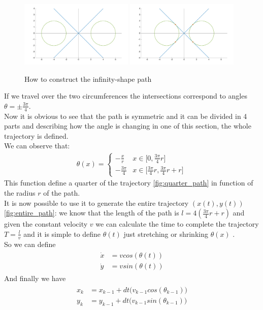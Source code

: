 \begin{figure}[!tbp]
  \centering
 {\includegraphics[width=0.48\textwidth]{img/constructionshape1_.png}\label{fig:constuctinfinity1}}
  \hfill
  {\includegraphics[width=0.48\textwidth]{img/constructionshape2_.png}\label{fig:constuctinfinity2}}
  \caption{How to construct the infinity-shape path}
\end{figure}

If we travel over the two circumferences the intersections correspond to angles $\theta = \pm \frac{3\pi}{4}$. \\
Now it is obvious to see that the path is symmetric and it can be divided in 4 parts and describing how the angle is changing in one of this section, the whole trajectory is defined.\\
We can observe that:
\begin{align}
\theta(x) =
\begin{cases}
    -\frac{x}{r}  &x\in \Big[0,\frac{3\pi}{4}r\Big] \quad \quad \ \ \  \\[10pt]
    -\frac{3\pi}{4} &x\in \Big[\frac{3\pi}{4}r ,\frac{3\pi}{4}r + r\Big]
\end{cases}
\end{align}
This function define a quarter of the trajectory \ref{fig:quarter_path} in function of the radius $r$ of the path.\\
It is now possible to use it to generate the entire trajectory $(x(t),y(t))$\ref{fig:entire_path}: we know that the length of the path is $l = 4(\frac{3\pi}{4}r + r)$ and given the constant velocity $v$ we can calculate the time to complete the trajectory $T = \frac{l}{v}$ and it is simple to define $\theta(t)$ just stretching or shrinking $\theta(x)$ .\\
So we can define
\begin{align}
\begin{split}
\dot{x} &= v cos(\theta(t)) \\
\dot{y} &= v sin(\theta(t))
\end{split}
\end{align}
And finally we have
\begin{align}
\begin{split}
x_k &= x_{k-1} + dt \big(v_{k-1} cos(\theta_{k-1})\big) \\
y_k &= y_{k-1} + dt \big(v_{k-1} sin(\theta_{k-1})\big)
\end{split}
\end{align}

